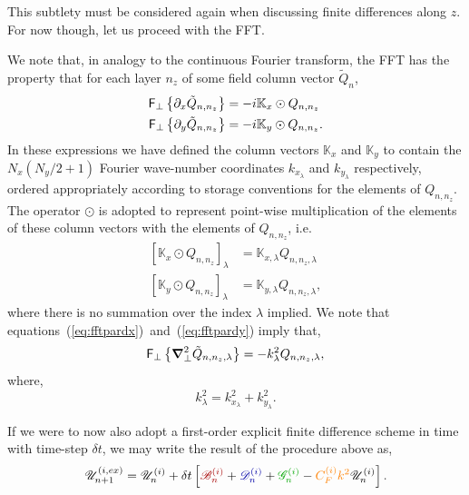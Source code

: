 \documentclass[12pt, letterpaper, oneside, leqno, openright]{memoir}
\newcommand{\fftperp}{\mathsf{F}_\perp}
\newcommand{\bfield}{\mathscr{B}}
\newcommand{\dfield}{\mathscr{D}}
\newcommand{\gfield}{\mathscr{G}}
\newcommand{\ufield}{\mathscr{U}}
\begin{document}
%
This subtlety must be considered again when discussing finite
differences along $z$. For now though, let us proceed with the
FFT.
%
\par
%
We note that, in analogy to the continuous Fourier transform,
the FFT has the property that for each layer $n_z$ of some field
column vector $\tilde Q_n$,
%
\begin{subequations}
\begin{align}
  \fftperp\left\{\pardx \tilde Q_{n,n_z}\right\} &= -i\mathbb{K}_{x} \odot Q_{n,n_z} \label{eq:fftpardx} \\
  \fftperp\left\{\pardy \tilde Q_{n,n_z}\right\} &= -i\mathbb{K}_{y} \odot Q_{n,n_z} \label{eq:fftpardy}.
\end{align}
\end{subequations}
%
In these expressions we have defined the column vectors
$\mathbb{K}_x$ and $\mathbb{K}_y$ to contain the $N_x(N_y/2+1)$
Fourier wave-number coordinates $k_{x_\lambda}$ and $k_{y_\lambda}$
respectively, ordered appropriately according to storage conventions
for the elements of $Q_{n,n_z}$. The operator $\odot$ is
adopted to represent point-wise multiplication of the elements
of these column vectors with the elements of $Q_{n,n_z}$, i.e.
%
\begin{subequations}
\begin{align}
  \left[\mathbb{K}_{x} \odot Q_{n,n_z}\right]_\lambda &= \mathbb{K}_{x,\lambda} Q_{n,n_z,\lambda} \\
  \left[\mathbb{K}_{y} \odot Q_{n,n_z}\right]_\lambda &= \mathbb{K}_{y,\lambda} Q_{n,n_z,\lambda},
\end{align}
\end{subequations}
%
where there is no summation over the index $\lambda$ implied. We note that
equations~(\ref{eq:fftpardx})~and~(\ref{eq:fftpardy}) imply that,
%
\begin{equation}
  \fftperp\left\{\delperp^2 \tilde Q_{n, n_z,\lambda}\right\} = -k^2_\lambda Q_{n,n_z,\lambda},
  \label{eq:fftdelperp}
\end{equation}
%
where,
\begin{equation}
  k^2_\lambda = k_{x_\lambda}^2 + k_{y_\lambda}^2.
\end{equation}
%
\par
%
If we were to now also adopt a first-order explicit finite difference
scheme in time with time-step $\delta t$, we may write the result
of the procedure above as,
%
\begin{equation}
  \ufield_{n+1}^{(i, ex)} = \ufield^{(i)}_n
                         + \delta t
                         \left[
                         {\color{red!65!black}                    \bfield^{(i)}_n}
                         + {\color{blue!65!black}                 \dfield^{(i)}_n}
                         + {\color{green!65!black}                \gfield^{(i)}_n}
                         - {\color{orange}         C_F^{(i)} k^2} \ufield^{(i)}_n
                         \right].
  \label{eq:exstep}
\end{equation}
\end{document}
